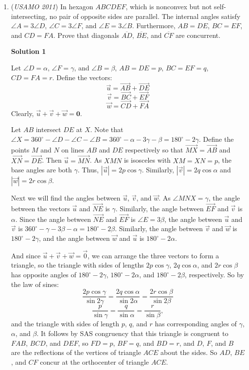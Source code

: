 \begin{enumerate}
 


	\item (\textit{USAMO 2011}) In hexagon $ABCDEF$, which is nonconvex but not self-intersecting, no pair of opposite sides are parallel.  The internal angles satisfy $\angle A = 3 \angle D$, $\angle C = 3 \angle F$, and $\angle E = 3 \angle B$.  Furthermore, $AB = DE$, $BC = EF$, and $CD = FA$.  Prove that diagonals $\overline{AD}$, $\overline{BE}$, and $\overline{CF}$ are concurrent.


 



\textbf{Solution 1}

Let $\angle D = \alpha$, $\angle F = \gamma$, and $\angle B = \beta$, $AB=DE=p$, $BC=EF=q$, $CD=FA=r$.  Define the vectors: 
 \[\vec{u} = \vec{AB} + \vec{DE}\] 
 \[\vec{v} = \vec{BC} + \vec{EF}\] 
 \[\vec{w} = \vec{CD} + \vec{FA}\] Clearly, $\vec{u}+\vec{v}+\vec{w}=\textbf{0}$.

 Let $AB$ intersect $DE$ at $X$. Note that $\angle X = 360^\circ - \angle D - \angle C - \angle B = 360^\circ - \alpha - 3\gamma - \beta = 180^\circ - 2\gamma$. Define the points $M$ and $N$ on lines $AB$ and $DE$ respectively so that $\vec{MX} = \vec{AB}$ and $\vec{XN} = \vec{DE}$. Then $\vec{u} = \vec{MN}$.  As $XMN$ is isosceles with $XM = XN = p$, the base angles are both $\gamma$.  Thus, $|\vec{u}|=2p \cos \gamma$.  Similarly, $|\vec{v}|=2q \cos \alpha$ and $|\vec{w}| = 2r \cos \beta$.

 Next we will find the angles between $\vec{u}$, $\vec{v}$, and $\vec{w}$.  As $\angle MNX = \gamma$, the angle between the vectors $\vec{u}$ and $\vec{NE}$ is $\gamma$.  Similarly, the angle between $\vec{EF}$ and $\vec{v}$ is $\alpha$. Since the angle between $\vec{NE}$ and $\vec{EF}$ is $\angle E = 3\beta$, the angle between $\vec{u}$ and $\vec{v}$ is $360^\circ - \gamma - 3\beta - \alpha = 180^\circ - 2\beta$.  Similarly, the angle between $\vec{v}$ and $\vec{w}$ is $180^\circ - 2\gamma$, and the angle between $\vec{w}$ and $\vec{u}$ is $180^\circ - 2\alpha$.

 And since $\vec{u}+\vec{v}+\vec{w}=\vec{0}$, we can arrange the three vectors to form a triangle, so the triangle with sides of lengths $2p \cos \gamma$, $2q \cos \alpha$, and $2r \cos \beta$ has opposite angles of $180^\circ - 2\gamma$, $180^\circ - 2\alpha$, and $180^\circ - 2\beta$, respectively.  So by the law of sines: 
 \[\frac{2p \cos \gamma}{\sin 2\gamma} = \frac{2q \cos \alpha}{\sin 2\alpha} = \frac{2r \cos \beta}{\sin 2\beta}\] 
 \[\frac{p}{\sin \gamma} = \frac{q}{\sin \alpha} = \frac{r}{\sin \beta},\] and the triangle with sides of length $p$, $q$, and $r$ has corresponding angles of $\gamma$, $\alpha$, and $\beta$. It follows by SAS congruency that this triangle is congruent to $FAB$, $BCD$, and $DEF$, so $FD=p$, $BF=q$, and $BD=r$, and $D$, $F$, and $B$ are the reflections of the vertices of triangle $ACE$ about the sides.  So $AD$, $BE$, and $CF$ concur at the orthocenter of triangle $ACE$.


\end{enumerate}
